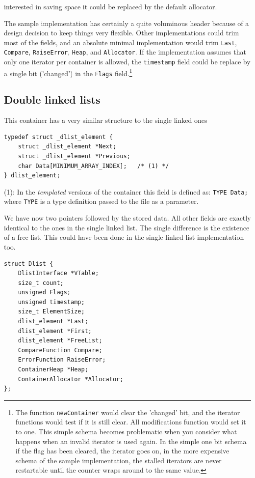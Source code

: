 \documentclass[12pt,a4paper]{memoir} %
\begin{document}
{{\begin{enumerate}
interested in saving space it could be replaced by the default allocator.
\end{enumerate}
The sample implementation has certainly a quite voluminous header because of a design decision to keep things very flexible. Other implementations 
could trim most of the fields, and an absolute minimal implementation would trim \texttt{Last}, \texttt{Compare}, \texttt{RaiseError}, \texttt{Heap}, 
and \texttt{Allocator}. If the implementation assumes that only one iterator per container is allowed, the \texttt{timestamp} field could be replace by 
a single bit ('changed') in the \texttt{Flags} field.\footnote{The function \texttt{newContainer} would clear the 'changed' bit, and the iterator 
functions would test if it is still clear. All modifications function would set it to one. This simple schema becomes problematic when you consider 
what happens when an invalid iterator is used again. In the simple one bit schema if the flag has been cleared, the iterator goes on, in the more 
expensive schema of the sample  implementation, the stalled iterators are never restartable until the counter wraps around to the same value.}
\subsection{Double linked lists}
This container has a very similar structure to the single linked ones
\begin{verbatim}
typedef struct _dlist_element {
    struct _dlist_element *Next;
	struct _dlist_element *Previous;
    char Data[MINIMUM_ARRAY_INDEX];   /* (1) */
} dlist_element;
\end{verbatim}

(1): In the \textsl{templated} versions of the container this field is defined as: \verb,TYPE Data;, where \verb,TYPE, is a type 
definition passed to the file as a parameter.

We have now two pointers followed by the stored data. All other fields are exactly identical to the ones in the single linked list. The single 
difference is the existence of a free list. This could have been done in the single linked list implementation too.
\begin{verbatim}
struct Dlist {
    DlistInterface *VTable;
    size_t count;        
    unsigned Flags;
    unsigned timestamp;
    size_t ElementSize;
    dlist_element *Last; 
    dlist_element *First;
    dlist_element *FreeList;
    CompareFunction Compare;
    ErrorFunction RaiseError; 
    ContainerHeap *Heap;
    ContainerAllocator *Allocator;
};
\end{verbatim}

}}
\end{document}
